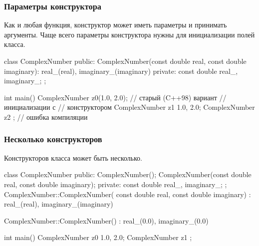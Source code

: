 \documentclass[compress, 8pt, aspectratio=169]{beamer}
\begin{document}
\begin{frame}[fragile]

    \frametitle{Параметры конструктора}

    \hfill\break
    Как и любая функция, конструктор может иметь параметры и принимать
    аргументы.
    Чаще всего параметры конструктора нужны для инициализации полей класса.

    \begin{myinplacelisting}[minted language=cpp]
class ComplexNumber {
public:
    ComplexNumber(const double real, const double imaginary):
        real_(real), imaginary_(imaginary)
    {}
private:
    const double real_, imaginary_;
};

int main() {
    ComplexNumber z0(1.0, 2.0); // старый (C++98) вариант
                                // инициализации с
                                // конструктором
    ComplexNumber z1 {1.0, 2.0};
    ComplexNumber z2 {}; // ошибка компиляции
}
    \end{myinplacelisting}

\end{frame}

\begin{frame}[fragile]

    \frametitle{Несколько конструкторов}

    \hfill\break
    Конструкторов класса может быть несколько.

    \begin{myinplacelisting}[minted language=cpp]
class ComplexNumber {
public:
    ComplexNumber();
    ComplexNumber(const double real, const double imaginary);
private:
    const double real_, imaginary_;
};
ComplexNumber::ComplexNumber(
    const double real, const double imaginary) :
    real_(real), imaginary_(imaginary)
{}

ComplexNumber::ComplexNumber() :
    real_(0.0), imaginary_(0.0) {}

int main() {
    ComplexNumber z0 {1.0, 2.0};
    ComplexNumber z1 {};
}
    \end{myinplacelisting}

\end{frame}
\end{document}
